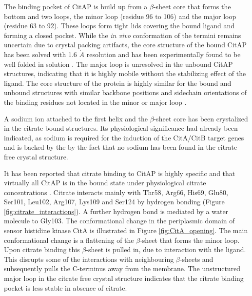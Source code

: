 \documentclass[english, a4paper, 12pt, titlepage, draft]{article}
\begin{document}
The binding pocket of CitAP is build up from a $\beta$-sheet core that forms the bottom and two loops, the minor loop (residue 96 to 106) and the major loop (residue 63 to 92).
These loops form tight lids covering the bound ligand and forming a closed pocket.
While the \textit{in vivo} conformation of the termini remains uncertain due to crystal packing artifacts, the core structure of the bound CitAP has been solved with 1.6 $\mathring{A}$ resolution and has been experimentally found to be well folded in solution \cite{CitA_2J80}.
The major loop is unresolved in the unbound CitAP structures, indicating that it is highly mobile without the stabilizing effect of the ligand.
The core structure of the protein is highly similar for the bound and unbound structures with similar backbone positions and sidechain orientations of the binding residues not located in the minor or major loop \cite{CitA_2J80}.

A sodium ion attached to the first helix and the $\beta$-sheet core has been crystalized in the citrate bound structures.
Its physiological significance had already been indicated, as sodium is required for the induction of the CitA/CitB target genes \cite{KlebsiellaMetabolism} and is backed by the by the fact that no sodium has been found in the citrate free crystal structure.

It has been reported that citrate binding to CitAP is highly specific and that virtually all CitAP is in the bound state under physiological citrate concentrations \cite{CitA_2J80}.
Citrate interacts mainly with Thr58, Arg66, His69, Glu80, Ser101, Leu102, Arg107, Lys109 and Ser124 by hydrogen bonding (Figure \ref{fig:citrate_interactions}).
A further hydrogen bond is mediated by a water molecule to Gly103.
The conformational change in the periplasmic domain of sensor histidine kinase CitA is illustrated in Figure \ref{fig:CitA_opening}.
The main conformational change is a flattening of the $\beta$-sheet that forms the minor loop.
Upon citrate binding this $\beta$-sheet is pulled in, due to interaction with the ligand.
This disrupts some of the interactions with neighbouring $\beta$-sheets and subsequently pulls the C-terminus away from the membrane.
The unstructured major loop in the citrate free crystal structure indicates that the citrate binding pocket is less stable in absence of citrate.
\end{document}
